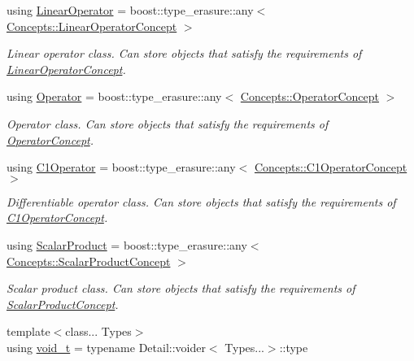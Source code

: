 \begin{DoxyCompactItemize}
using \hyperlink{group__SpacyGroup_ga584f7b9d82a844302ba0d77c3a1b6640_ga584f7b9d82a844302ba0d77c3a1b6640}{Linear\+Operator} = boost\+::type\+\_\+erasure\+::any$<$ \hyperlink{group__ConceptGroup_gaf0e18e41c434cfceb77ccb8e785a8055_gaf0e18e41c434cfceb77ccb8e785a8055}{Concepts\+::\+Linear\+Operator\+Concept} $>$
\begin{DoxyCompactList}\small\item\em Linear operator class. Can store objects that satisfy the requirements of \hyperlink{group__ConceptGroup_gaf0e18e41c434cfceb77ccb8e785a8055_LinearOperatorConceptAnchor}{Linear\+Operator\+Concept}. \end{DoxyCompactList}\item 
using \hyperlink{group__SpacyGroup_ga3f89622eba80cf840b2a7102f1303455_ga3f89622eba80cf840b2a7102f1303455}{Operator} = boost\+::type\+\_\+erasure\+::any$<$ \hyperlink{group__ConceptGroup_ga7d984281b647a6d8e4c0a7ea5faeb90e_ga7d984281b647a6d8e4c0a7ea5faeb90e}{Concepts\+::\+Operator\+Concept} $>$
\begin{DoxyCompactList}\small\item\em Operator class. Can store objects that satisfy the requirements of \hyperlink{group__ConceptGroup_ga7d984281b647a6d8e4c0a7ea5faeb90e_OperatorConceptAnchor}{Operator\+Concept}. \end{DoxyCompactList}\item 
using \hyperlink{group__SpacyGroup_ga87ae8cb0d7a567a4bb181e0a9f182620_ga87ae8cb0d7a567a4bb181e0a9f182620}{C1\+Operator} = boost\+::type\+\_\+erasure\+::any$<$ \hyperlink{group__ConceptGroup_ga14a12c741dc237e32862fa4bc315451b_ga14a12c741dc237e32862fa4bc315451b}{Concepts\+::\+C1\+Operator\+Concept} $>$
\begin{DoxyCompactList}\small\item\em Differentiable operator class. Can store objects that satisfy the requirements of \hyperlink{group__ConceptGroup_ga14a12c741dc237e32862fa4bc315451b_C1OperatorConceptAnchor}{C1\+Operator\+Concept}. \end{DoxyCompactList}\item 
using \hyperlink{group__SpacyGroup_ga9fe0b4de20da1ab1ca3d04a0f96343e1_ga9fe0b4de20da1ab1ca3d04a0f96343e1}{Scalar\+Product} = boost\+::type\+\_\+erasure\+::any$<$ \hyperlink{group__ConceptGroup_ga1308724cda3078f228fb05c29556805d_ga1308724cda3078f228fb05c29556805d}{Concepts\+::\+Scalar\+Product\+Concept} $>$
\begin{DoxyCompactList}\small\item\em Scalar product class. Can store objects that satisfy the requirements of \hyperlink{group__ConceptGroup_ga1308724cda3078f228fb05c29556805d_ScalarProductConceptAnchor}{Scalar\+Product\+Concept}. \end{DoxyCompactList}\item 
\hypertarget{namespaceSpacy_a63ae343327f8e3bde02913c0be7d8655}{}{\footnotesize template$<$class... Types$>$ }\\using \hyperlink{namespaceSpacy_a63ae343327f8e3bde02913c0be7d8655}{void\+\_\+t} = typename Detail\+::voider$<$ Types...$>$\+::type\label{namespaceSpacy_a63ae343327f8e3bde02913c0be7d8655}


\end{DoxyCompactItemize}
